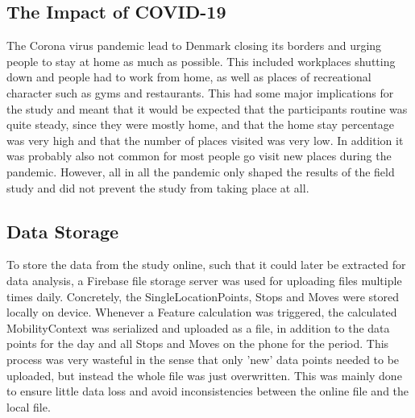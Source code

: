 \subsection{The Impact of COVID-19}
The Corona virus pandemic lead to Denmark closing its borders and urging people to stay at home as much as possible. This included workplaces shutting down and people had to work from home, as well as places of recreational character such as gyms and restaurants. This had some major implications for the study and meant that it would be expected that the participants routine was quite steady, since they were mostly home, and that the home stay percentage was very high and that the number of places visited was very low. In addition it was probably also not common for most people go visit new places during the pandemic. However, all in all the pandemic only shaped the results of the field study and did not prevent the study from taking place at all.

\subsection{Data Storage}
To store the data from the study online, such that it could later be extracted for data analysis, a Firebase file storage server was used for uploading files multiple times daily. Concretely, the SingleLocationPoints, Stops and Moves were stored locally on device. Whenever a Feature calculation was triggered, the calculated MobilityContext was serialized and uploaded as a file, in addition to the data points for the day and all Stops and Moves on the phone for the period. This process was very wasteful in the sense that only 'new' data points needed to be uploaded, but instead the whole file was just overwritten. This was mainly done to ensure little data loss and avoid inconsistencies between the online file and the local file.
